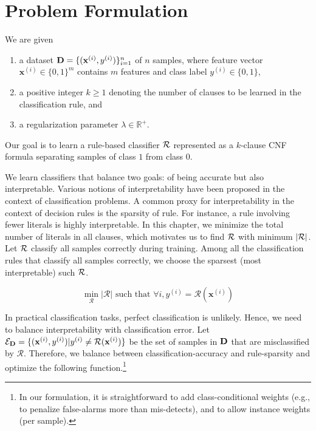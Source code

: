 

 \section{Problem Formulation}
 \label{interpretability_imli_sec:problem}
We are given 
\begin{enumerate}
	\item a dataset $ \mathbf{D} = \{(\mathbf{x}^{(i)}, y^{(i)})\}_{i=1}^n$ of $ n $ samples, where feature vector $ \mathbf{x}^{(i)} \in \{0, 1\}^m $ contains $ m $ features and class label $ y^{(i)} \in \{0,1\} $,
	\item a positive integer $ k \ge 1 $ denoting the number of clauses to be learned in the classification rule, and
	\item a regularization parameter $ \lambda \in \mathbb{R}^+ $.
\end{enumerate}
Our goal is to learn a rule-based classifier $ {\mathcal{R}} $ represented as a $ k $-clause CNF formula separating samples of class $ 1 $ from class $ 0 $. 
 
 

 We learn classifiers that balance two 
 goals: of  being accurate but also interpretable.  
 Various notions of interpretability have been proposed in the context of   classification problems. A common proxy for interpretability in the context of decision rules 
 is the sparsity of rule. For instance, a rule involving fewer literals is highly interpretable.  In this chapter, we minimize the total number of literals in all clauses, which motivates us to  find $ {\mathcal{R}}  $ with minimum  $ |{\mathcal{R}}| $. Let $ {\mathcal{R}} $ classify all samples correctly during training. Among all the classification rules that classify all samples correctly,  we choose the sparsest (most interpretable) such $ {\mathcal{R}} $. 
 
 

 \[
 \min\limits_{\mathcal{R}} |\mathcal{R}|\text{ such that }\forall i, y^{(i)}=\mathcal{R}(\mathbf{x}^{(i)})
 \]

 

 In practical classification tasks, perfect classification is unlikely. Hence, we need to balance interpretability with classification error.  Let $ \mathcal{E}_{\mathbf{D}} = \{(\mathbf{x}^{(i)},y^{(i)}) | y^{(i)} \ne \mathcal{R}(\mathbf{x}^{(i)}) \} $   be  the set of samples in $ \mathbf{D} $ that are misclassified  by $ \mathcal{R} $. Therefore, we balance between classification-accuracy and rule-sparsity and optimize the following function.\footnote{In our formulation, it is  straightforward to add class-conditional weights  (e.g., to penalize  false-alarms more than mis-detects), and to allow instance weights (per sample).}

